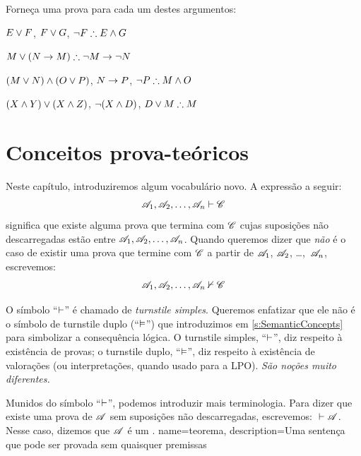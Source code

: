 \problempart 
Forneça uma prova para cada um destes argumentos:
\begin{compactlist}
\item $E\vee F$, $F\vee G$, $\enot F \therefore E \eand G$
\item $M\eor(N\eif M) \therefore \enot M \eif \enot N$
\item $(M \vee N) \wedge (O \vee P)$, $N \rightarrow P$, $\enot P \therefore M\eand O$
\item $(X\wedge Y)\vee(X\wedge Z)$, $\neg(X\wedge D)$, $D\eor M \therefore M$
\end{compactlist}



\chapter{Conceitos prova-teóricos}\label{s:ProofTheoreticConcepts}

Neste capítulo, introduziremos algum vocabulário novo. A expressão a seguir:
$$\mathscr{A}_1, \mathscr{A}_2, \ldots, \mathscr{A}_n \vdash \mathscr{C}$$
significa que existe alguma prova que termina com $\mathscr{C}$ cujas suposições não descarregadas estão entre $\mathscr{A}_1, \mathscr{A}_2, \ldots, \mathscr{A}_n$. Quando queremos dizer que \emph{não} é o caso de existir uma prova que termine com $\mathscr{C}$ a partir de $\mathscr{A}_1$, $\mathscr{A}_2$, \dots,~$\mathscr{A}_n$, escrevemos:  $$\mathscr{A}_1, \mathscr{A}_2, \ldots, \mathscr{A}_n \nvdash \mathscr{C}$$

O símbolo \textquotedblleft{}$\vdash$\textquotedblright{} é chamado de \emph{turnstile simples}. Queremos enfatizar que ele não é o símbolo de {turnstile duplo} (\textquotedblleft{}$\vDash$\textquotedblright{}) que introduzimos em \cref{s:SemanticConcepts} para simbolizar a consequência lógica. O turnstile simples, \textquotedblleft{}$\vdash$\textquotedblright{}, diz respeito à existência de provas; o turnstile duplo, \textquotedblleft{}$\vDash$\textquotedblright{}, diz respeito à existência de valorações (ou interpretações, quando usado para a LPO). \emph{São noções muito diferentes.}

Munidos do símbolo \textquotedblleft{}$\vdash$\textquotedblright{}, podemos introduzir mais terminologia. Para dizer que existe uma prova de $\mathscr{A}$ sem suposições não descarregadas, escrevemos: ${} \vdash \mathscr{A}$. Nesse caso, dizemos que $\mathscr{A}$ é um .
{
name=teorema,
description={Uma senten\c{c}a que pode ser provada sem quaisquer premissas}
}

